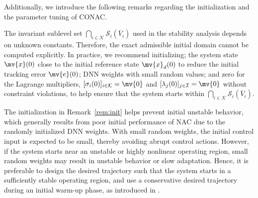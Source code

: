 \documentclass[letterpaper, journal, twoside]{IEEEtran}
\begin{document}

Additionally, we introduce the following remarks regarding the initialization and the parameter tuning of CONAC.

\begin{remark} \label{rem:init}
  The invariant sublevel set 
  $
    \bigcap_{i\in\mathcal{K}} 
    \mathcal{S}_i(\overline{V}_i)
  $ 
  used in the stability analysis depends on unknown constants.
  Therefore, the exact admissible initial domain cannot be computed explicitly.
  In practice, we recommend initializing; the system state $\mv{x}(0)$ close to the initial reference state $\mv{x}_d(0)$ to reduce the initial tracking error $\mv{e}(0)$; DNN weights with small random values; and zero for the Lagrange multipliers, $[\sigma_i(0)]_{i\in\mathcal{K}}=\mv{0}$ and $[\lambda_j(0)]_{j\in\mathcal{I}}=\mv{0}$ without constraint violations, to help ensure that the system starts within
  $
    \bigcap_{i\in\mathcal{K}} 
    \mathcal{S}_i(\overline{V}_i)
    .
  $
\end{remark}

\begin{remark} \label{rem:ref}  
  The initialization in Remark~\ref{rem:init} helps prevent initial unstable behavior, which generally results from poor initial performance of NAC due to the randomly initialized DNN weights.
  With small random weights, the initial control input is expected to be small, thereby avoiding abrupt control actions.
  However, if the system starts near an unstable or highly nonlinear operating region, small random weights may result in unstable behavior or slow adaptation.
  Hence, it is preferable to design the desired trajectory such that the system starts in a sufficiently stable operating region, and use a conservative desired trajectory during an initial warm-up phase, as introduced in \cite{Ryu:2025aa}.
\end{remark}
\end{document}
